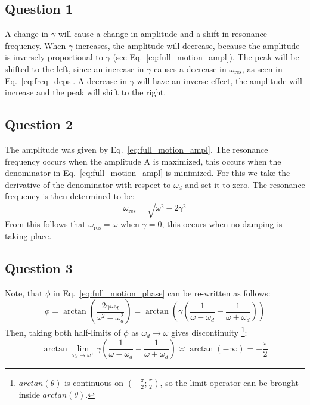 \subsection{Question 1}

A change in $\gamma$ will cause a change in amplitude and a shift in resonance frequency. When $\gamma$ increases, the amplitude will decrease, because the amplitude is inversely proportional to $\gamma$ (see Eq.~\eqref{eq:full_motion_ampl}). The peak will be shifted to the left, since an increase in $\gamma$ causes a decrease in $\omega_{\text{res}}$, as seen in Eq.~\eqref{eq:freq_deps}. A decrease in $\gamma$ will have an inverse effect, the amplitude will increase and the peak will shift to the right.

\subsection{Question 2}
The amplitude was given by Eq.~\eqref{eq:full_motion_ampl}. The resonance frequency occurs when the amplitude A is maximized, this occurs when the denominator in Eq.~\eqref{eq:full_motion_ampl} is minimized. For this we take the derivative of the denominator with respect to $\omega_d$ and set it to zero. The resonance frequency is then determined to be: 
\begin{equation} \label{eq:freq_deps}
        \omega_{\text{res}} = \sqrt{\omega^2 - 2\gamma^2}
\end{equation}
From this follows that $\omega_{\text{res}} = \omega$ when $\gamma = 0$, this occurs when no damping is taking place.

\subsection{Question 3}
Note, that $\phi$ in Eq.~\eqref{eq:full_motion_phase} can be re-written as follows:
\begin{equation*}
        \phi = \arctan(\frac{2\gamma\omega_d}{\omega^2 - \omega_d^2}) = \arctan(\gamma ( \frac{1}{\omega-\omega_d} - \frac{1}{\omega+\omega_d} ))
\end{equation*}
Then, taking both half-limits of $\phi$ as $\omega_d \rightarrow \omega$ gives discontinuity \footnote{$arctan(\theta)$ is continuous on $(-\frac{\pi}{2};\frac{\pi}{2})$, so the limit operator can be brought inside $arctan(\theta)$.}:
\begin{equation*}
        \arctan \lim_{\omega_d \rightarrow \omega^+} {\gamma ( \frac{1}{\omega-\omega_d} - \frac{1}{\omega+\omega_d} )} \asymp \arctan( -\infty) = -\frac{\pi}{2}
\end{equation*}

